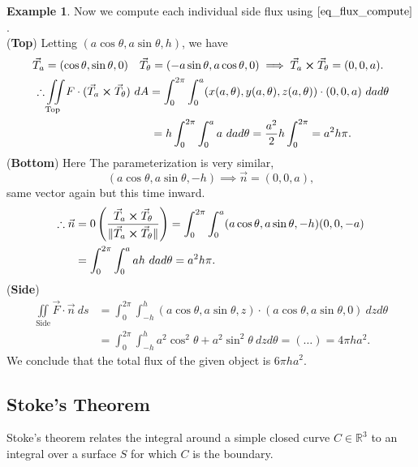 \documentclass[
	12pt,
	]{article}
\newcommand{\R}{\mathbb{R}}
\DeclarePairedDelimiter{\norm}{\lVert}{\rVert}
\theoremstyle{custom}
\theoremstyle{custom}
\theoremstyle{custom}
\theoremstyle{custom}
\theoremstyle{custom}
\theoremstyle{definition}
\newtheorem{example}{Example}[section]
\theoremstyle{example}
\theoremstyle{note}
\theoremstyle{remark}
\theoremstyle{example}
\newcounter{theo}[section]\setcounter{theo}{0}
\numberwithin{equation}{subsection}
\begin{document}
\begin{example}
					\noindent Now we compute each individual side flux using $\eqref{eq_flux_compute}$. \\
					(\textbf{Top}) Letting $(a\cos\theta, a\sin\theta, h)$, we have 
					\begin{align*}
						\vec{T}_{a} &= (\cos\theta, \sin\theta, 0) \quad \vec{T}_{\theta} = (-a\sin\theta, a\cos\theta , 0) \implies \vec{T}_{a} \cross \vec{T}_{\theta } = (0,0,a).\\
						\therefore &\iint\limits_{\text{Top}} F\cdot (\vec{T}_{a} \cross \vec{T}_{\theta })\ dA = \int_{0}^{2\pi} \int_{0}^{a} (x(a,\theta) , y(a,\theta) , z(a,\theta))\cdot (0,0,a) \ dad\theta \\
						&\hphantom{\iint\limits_{\text{Top}} F\cdot (\vec{T}_{a} \cross \vec{T}_{\theta })\ dA} \ = h\int_{0}^{2\pi} \int_{0}^{a} a\ dad\theta = \frac{a^{2}}{2}h \int_{0}^{2\pi} = a^{2}h\pi.
					\end{align*}
					(\textbf{Bottom}) Here The parameterization is very similar, 
						$$(a\cos\theta, a\sin\theta, -h) \implies \vec{n} = (0,0,a),$$ 
						same vector again but this time inward.
						\begin{align*}
							\therefore \vec{n} &= 0\left(\frac{\vec{T}_{a} \cross \vec{T}_{\theta}}{\norm{\vec{T}_{a} \cross \vec{T}_{\theta}}}\right) = \int_{0}^{2\pi} \int_{0}^{a} (a\cos\theta, a\sin\theta, -h) (0,0,-a)\\
							&= \int_{0}^{2\pi}\int_{0}^{a} ah \ dad\theta = a^{2}h\pi.
						\end{align*}
					\noindent(\textbf{Side})
					\begin{align*}
						\iint\limits_{\text{Side}} \vec{F}\cdot\vec{n} \ ds &= \int_{0}^{2\pi} \int_{-h}^{h} (a\cos\theta, a\sin\theta,z) \cdot(a\cos\theta,a\sin\theta, 0) \ dzd\theta \\
						&= \int_{0}^{2\pi}\int_{-h}^{h} a^{2}\cos^{2}\theta + a^{2}\sin^{2}\theta \ dzd\theta = (\dots) = 4\pi ha^{2}.
					\end{align*}
					We conclude that the total flux of the given object is $6\pi ha^{2}$.
				\end{example}
				\subsection{Stoke's Theorem}
				Stoke's theorem relates the integral around a simple closed curve $C \in \R^{3}$ to an integral over a surface $S$ for which $C$ is the boundary.
				
\end{document}
